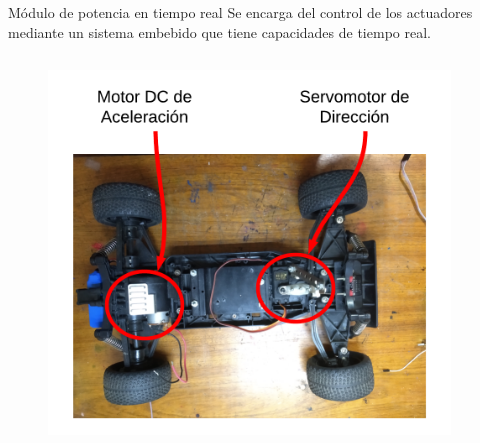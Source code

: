 \documentclass[10pt]{beamer}
\begin{document}
\begin{frame}{Módulo de potencia en tiempo real}
    Se encarga del control de los actuadores mediante un sistema embebido 
    que tiene capacidades de tiempo real\footnotemark.

    \begin{columns}
        \begin{column}{0.5\textwidth}
            \begin{figure}[!h] 
                \centering
                \includegraphics[width=0.95\textwidth]{../img/actuadores}
                \end{figure}
                    

\end{column}
\end{columns}
\end{frame}
\end{document}

